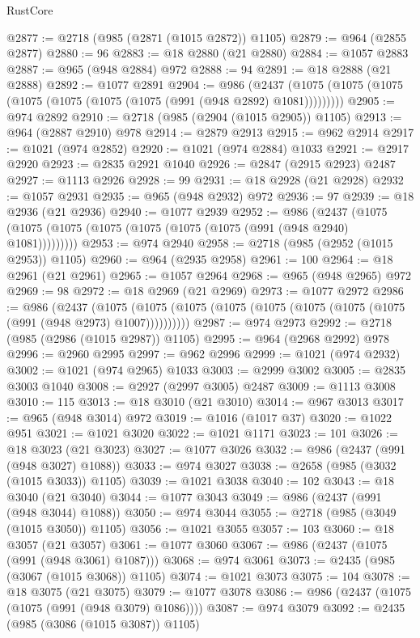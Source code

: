 \begin{lexlean}{RustCore}
\begin{coremodule}
@2877 := @2718 (@985 (@2871 (@1015 @2872)) @1105)
@2879 := @964 (@2855 @2877)
@2880 := 96
@2883 := @18 @2880 (@21 @2880)
@2884 := @1057 @2883
@2887 := @965 (@948 @2884) @972
@2888 := 94
@2891 := @18 @2888 (@21 @2888)
@2892 := @1077 @2891
@2904 := @986
    (@2437 (@1075 (@1075 (@1075 (@1075 (@1075 (@1075 (@1075 (@991 (@948 @2892) @1081)))))))))
@2905 := @974 @2892
@2910 := @2718 (@985 (@2904 (@1015 @2905)) @1105)
@2913 := @964 (@2887 @2910) @978
@2914 := @2879 @2913
@2915 := @962 @2914
@2917 := @1021 (@974 @2852)
@2920 := @1021 (@974 @2884) @1033
@2921 := @2917 @2920
@2923 := @2835 @2921 @1040
@2926 := @2847 (@2915 @2923) @2487
@2927 := @1113 @2926
@2928 := 99
@2931 := @18 @2928 (@21 @2928)
@2932 := @1057 @2931
@2935 := @965 (@948 @2932) @972
@2936 := 97
@2939 := @18 @2936 (@21 @2936)
@2940 := @1077 @2939
@2952 := @986
    (@2437 (@1075 (@1075 (@1075 (@1075 (@1075 (@1075 (@1075 (@991 (@948 @2940) @1081)))))))))
@2953 := @974 @2940
@2958 := @2718 (@985 (@2952 (@1015 @2953)) @1105)
@2960 := @964 (@2935 @2958)
@2961 := 100
@2964 := @18 @2961 (@21 @2961)
@2965 := @1057 @2964
@2968 := @965 (@948 @2965) @972
@2969 := 98
@2972 := @18 @2969 (@21 @2969)
@2973 := @1077 @2972
@2986 := @986
    (@2437
      (@1075 (@1075 (@1075 (@1075 (@1075 (@1075 (@1075 (@1075 (@991 (@948 @2973) @1007))))))))))
@2987 := @974 @2973
@2992 := @2718 (@985 (@2986 (@1015 @2987)) @1105)
@2995 := @964 (@2968 @2992) @978
@2996 := @2960 @2995
@2997 := @962 @2996
@2999 := @1021 (@974 @2932)
@3002 := @1021 (@974 @2965) @1033
@3003 := @2999 @3002
@3005 := @2835 @3003 @1040
@3008 := @2927 (@2997 @3005) @2487
@3009 := @1113 @3008
@3010 := 115
@3013 := @18 @3010 (@21 @3010)
@3014 := @967 @3013
@3017 := @965 (@948 @3014) @972
@3019 := @1016 (@1017 @37)
@3020 := @1022 @951
@3021 := @1021 @3020
@3022 := @1021 @1171
@3023 := 101
@3026 := @18 @3023 (@21 @3023)
@3027 := @1077 @3026
@3032 := @986 (@2437 (@991 (@948 @3027) @1088))
@3033 := @974 @3027
@3038 := @2658 (@985 (@3032 (@1015 @3033)) @1105)
@3039 := @1021 @3038
@3040 := 102
@3043 := @18 @3040 (@21 @3040)
@3044 := @1077 @3043
@3049 := @986 (@2437 (@991 (@948 @3044) @1088))
@3050 := @974 @3044
@3055 := @2718 (@985 (@3049 (@1015 @3050)) @1105)
@3056 := @1021 @3055
@3057 := 103
@3060 := @18 @3057 (@21 @3057)
@3061 := @1077 @3060
@3067 := @986 (@2437 (@1075 (@991 (@948 @3061) @1087)))
@3068 := @974 @3061
@3073 := @2435 (@985 (@3067 (@1015 @3068)) @1105)
@3074 := @1021 @3073
@3075 := 104
@3078 := @18 @3075 (@21 @3075)
@3079 := @1077 @3078
@3086 := @986 (@2437 (@1075 (@1075 (@991 (@948 @3079) @1086))))
@3087 := @974 @3079
@3092 := @2435 (@985 (@3086 (@1015 @3087)) @1105)

\end{coremodule}
\end{lexlean}
